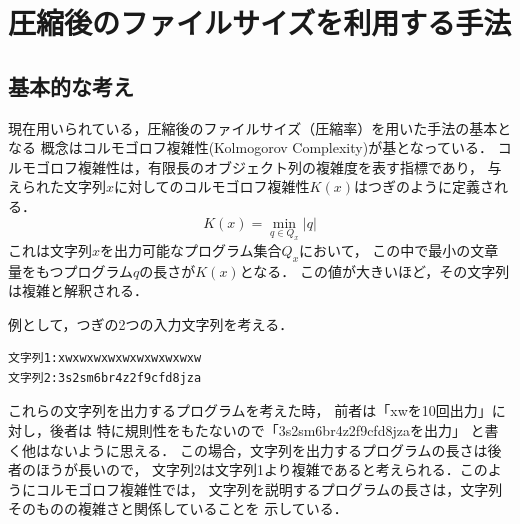 \begin{table}[tb]%
\caption{単語を登録した後のLZW辞書．}
\label{lz2}
\begin{center}
\end{center}
\end{table}



\section{圧縮後のファイルサイズを利用する手法}
\subsection{基本的な考え}
現在用いられている，圧縮後のファイルサイズ（圧縮率）を用いた手法の基本となる
概念はコルモゴロフ複雑性(Kolmogorov Complexity)\cite{osamu2006}が基となっている．
コルモゴロフ複雑性は，有限長のオブジェクト列の複雑度を表す指標であり，
与えられた文字列$x$に対してのコルモゴロフ複雑性$K(x)$はつぎのように定義される．
\begin{equation}
K(x) = \min_{q \in Q_x} |q| \label{kol}
\end{equation}
これは文字列$x$を出力可能なプログラム集合$Q_x$において，
この中で最小の文章量をもつプログラム$q$の長さが$K(x)$となる．
この値が大きいほど，その文字列は複雑と解釈される．

例として，つぎの2つの入力文字列を考える．
\begin{verbatim}
文字列1:xwxwxwxwxwxwxwxwxwxw
文字列2:3s2sm6br4z2f9cfd8jza
\end{verbatim}
これらの文字列を出力するプログラムを考えた時，
前者は「xwを10回出力」に対し，後者は
特に規則性をもたないので「3s2sm6br4z2f9cfd8jzaを出力」
と書く他はないように思える．
この場合，文字列を出力するプログラムの長さは後者のほうが長いので，
文字列2は文字列1より複雑であると考えられる．このようにコルモゴロフ複雑性では，
文字列を説明するプログラムの長さは，文字列そのものの複雑さと関係していることを
示している．

